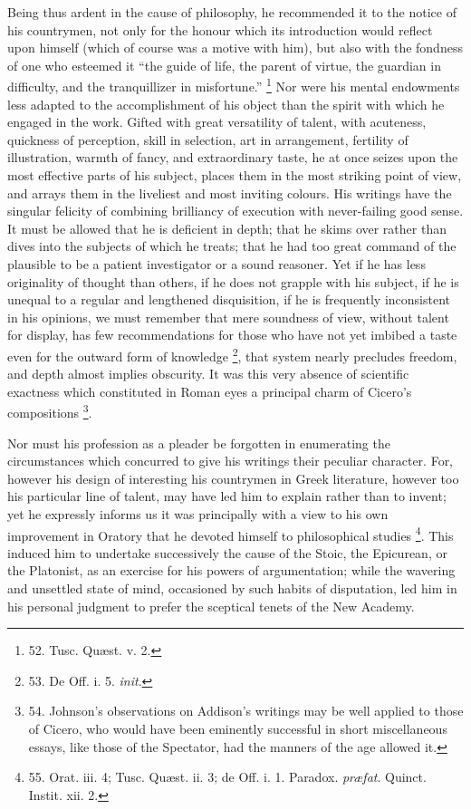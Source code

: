 Being thus ardent in the cause
of philosophy, he recommended it to the notice of his countrymen, not
only for the honour which its introduction would reflect upon himself
(which of course was a motive with him), but also with the fondness of
one who esteemed it ``the guide of life, the parent of virtue, the
guardian in difficulty, and the tranquillizer in misfortune.'' \footnote{52. Tusc. Quæst. v. 2.} Nor were his mental endowments less adapted to the
accomplishment of his object than the spirit with which he engaged in
the work. Gifted with great versatility of talent, with acuteness,
quickness of perception, skill in selection, art in arrangement,
fertility of illustration, warmth of fancy, and extraordinary taste,
he at once seizes upon the most effective parts of his subject, places
them in the most striking point of view, and arrays them in the
liveliest and most inviting colours. His writings have the singular
felicity of combining brilliancy of execution with never-failing good
sense. It must be allowed that he is deficient in depth; that he skims
over rather than dives into the subjects of which he treats; that he
had too great command of the plausible to be a patient investigator or
a sound reasoner. Yet if he has less originality of thought than
others, if he does not grapple with his subject, if he is unequal to a
regular and lengthened disquisition, if he is frequently inconsistent
in his opinions, we must remember that mere soundness of view, without
talent for display, has few recommendations for those who have not yet
imbibed a taste even for the outward form of knowledge \footnote{53. De Off. i. 5. \emph{init}.}, that system nearly precludes freedom, and depth almost
implies obscurity. It was this very absence of scientific exactness
which constituted in Roman eyes a principal charm of Cicero's
compositions \footnote{54. Johnson's observations on
Addison's writings may be well applied to those of Cicero, who would
have been eminently successful in short miscellaneous essays, like
those of the Spectator, had the manners of the age allowed it.}.

Nor must his profession as a
pleader be forgotten in enumerating the circumstances which concurred
to give his writings their peculiar character. For, however his design
of interesting his countrymen in Greek literature, however too his
particular line of talent, may have led him to explain rather than to
invent; yet he expressly informs us it was principally with a view to
his own improvement in Oratory that he devoted himself to philosophical studies \footnote{55. Orat. iii. 4; Tusc. Quæst.
ii. 3; de Off. i. 1. Paradox. \emph{præfat}. Quinct. Instit. xii. 2.}.
This induced him to undertake successively the cause of the Stoic, the
Epicurean, or the Platonist, as an exercise for his powers of
argumentation; while the wavering and unsettled state of mind,
occasioned by such habits of disputation, led him in his personal
judgment to prefer the sceptical tenets of the New Academy.

